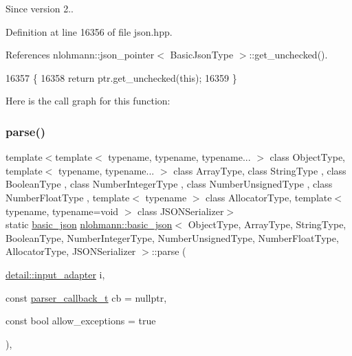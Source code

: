 \begin{DoxySince}{Since}
version 2.. 
\end{DoxySince}


Definition at line 16356 of file json.\+hpp.



References nlohmann\+::json\+\_\+pointer$<$ Basic\+Json\+Type $>$\+::get\+\_\+unchecked().


\begin{DoxyCode}
16357     \{
16358         \textcolor{keywordflow}{return} ptr.get\_unchecked(\textcolor{keyword}{this});
16359     \}
\end{DoxyCode}
Here is the call graph for this function\+:
\mbox{\label{classnlohmann_1_1basic__json_aa9676414f2e36383c4b181fe856aa3c0}} 
\subsubsection{\texorpdfstring{parse()}{parse()}\hspace{0.1cm}{\footnotesize\ttfamily [1/3]}}
{\footnotesize\ttfamily template$<$template$<$ typename, typename, typename... $>$ class Object\+Type, template$<$ typename, typename... $>$ class Array\+Type, class String\+Type , class Boolean\+Type , class Number\+Integer\+Type , class Number\+Unsigned\+Type , class Number\+Float\+Type , template$<$ typename $>$ class Allocator\+Type, template$<$ typename, typename=void $>$ class J\+S\+O\+N\+Serializer$>$ \\
static \hyperlink{classnlohmann_1_1basic__json}{basic\+\_\+json} \hyperlink{classnlohmann_1_1basic__json}{nlohmann\+::basic\+\_\+json}$<$ Object\+Type, Array\+Type, String\+Type, Boolean\+Type, Number\+Integer\+Type, Number\+Unsigned\+Type, Number\+Float\+Type, Allocator\+Type, J\+S\+O\+N\+Serializer $>$\+::parse (\begin{DoxyParamCaption}\item[{\hyperlink{classnlohmann_1_1detail_1_1input__adapter}{detail\+::input\+\_\+adapter}}]{i,  }\item[{const \hyperlink{classnlohmann_1_1basic__json_ab4f78c5f9fd25172eeec84482e03f5b7}{parser\+\_\+callback\+\_\+t}}]{cb = {\ttfamily nullptr},  }\item[{const bool}]{allow\+\_\+exceptions = {\ttfamily true} }\end{DoxyParamCaption})\hspace{0.3cm}{\ttfamily [inline]}, {\ttfamily [static]}}



